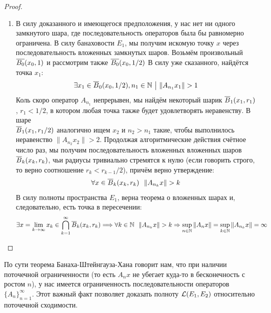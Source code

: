 \begin{proof}
\begin{enumerate}
		\item В силу доказанного и имеющегося предположения, у нас нет ни одного замкнутого шара, где последовательность операторов была бы равномерно ограничена. В силу банаховости $E_1$, мы получим искомую точку $x$ через последовательность вложенных замкнутых шаров. Возьмём произвольный $\overline{B_0}(x_0, 1)$ и рассмотрим также $\overline{B_0}(x_0, 1 / 2)$ В силу уже сказанного, найдётся точка $x_1$:
		\[
			\exists x_1 \in \overline{B}_0(x_0, 1 / 2), n_1 \in \mathbb{N} \ \big|\  \|A_{n_1}x_1\| > 1
		\]
		Коль скоро оператор $A_{n_1}$ непрерывен, мы найдём некоторый шарик $\overline{B}_1(x_1, r_1)$, $r_1 < 1 / 2$, в котором любая точка также будет удовлетворять неравенству. В шаре \\ $\overline{B}_1(x_1, r_1 / 2)$ аналогично ищем $x_2$ и $n_2 > n_1$ такие, чтобы выполнилось неравенство $\|A_{n_2}x_2\| > 2$. Продолжая алгоритмические действия счётное число раз, мы получим последовательность вложенных вложенных шаров $\overline{B}_k(x_k, r_k)$, чьи радиусы тривиально стремятся к нулю (если говорить строго, то верно соотношение $r_k < r_{k - 1} / 2$), причём верно утверждение:
		\[
			\forall x \in \overline{B}_k(x_k, r_k)\ \ \|A_{n_k}x\| > k
		\]
		В силу полноты пространства $E_1$, верна теорема о вложенных шарах и, следовательно, есть точка в пересечении:
		\[
			\exists x = \lim_{k \to \infty} x_k \in \bigcap_{k = 1}^\infty \overline{B}_k(x_k, r_k) \Longrightarrow \forall k \in \mathbb{N}\ \ \|A_{n_k}x\| > k \Rightarrow \sup_{n \in \mathbb{N}} \|A_nx\| = \sup_{k \in \mathbb{N}} \|A_{n_k}x\| = \infty
		\]
	\end{enumerate}
\end{proof}

\begin{anote}
	По сути теорема Банаха-Штейнгауза-Хана говорит нам, что при наличии поточечной ограниченности (то есть $A_nx$ не убегает куда-то в бесконечность с ростом $n$), у нас имеется ограниченность последовательности операторов $\{A_n\}_{n = 1}^\infty$. Этот важный факт позволяет доказать полноту $\mathcal{L}(E_1, E_2)$ относительно поточечной сходимости.
\end{anote}
